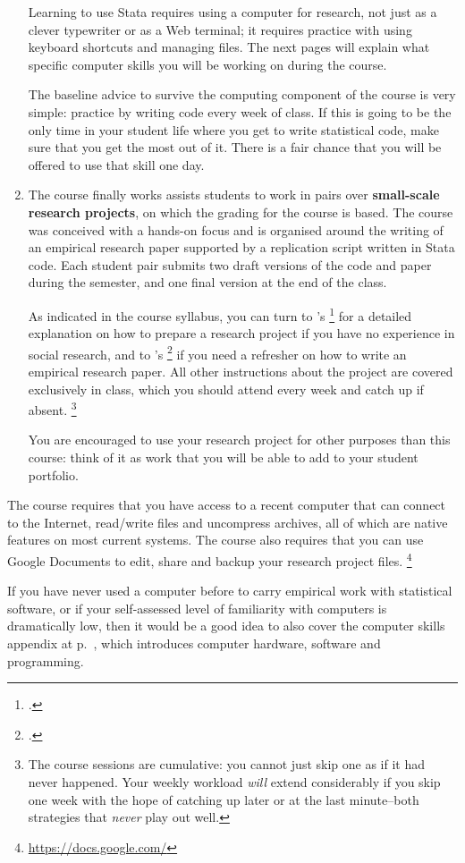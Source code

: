 \begin{enumerate}
		Learning to use Stata requires using a computer for research, not just as a clever typewriter or as a Web terminal; it requires practice with using keyboard shortcuts and managing files. The next pages will explain what specific computer skills you will be working on during the course.%
		
		The baseline advice to survive the computing component of the course is very simple: practice by writing code every week of class. If this is going to be the only time in your student life where you get to write statistical code, make sure that you get the most out of it. There is a fair chance that you will be offered to use that skill one day.%


  \item The course finally works assists students to work in pairs over \textbf{small-scale research projects}, on which the grading for the course is based. %
		The course was conceived with a hands-on focus and is organised around the  writing of an empirical research paper supported by a replication script written in Stata code. Each student pair submits two draft versions of the code and paper during the semester, and one final version at the end of the class.%
		
		As indicated in the course syllabus, you can turn to \citeauthor{BoothWilliams:2003v}'s \footcite{BoothWilliams:2003v} for a detailed explanation on how to prepare a research project if you have no experience in social research, and to \citeauthor{White:2005a}'s \footcite{White:2005a} if you need a refresher on how to write an empirical research paper. All other instructions about the project are covered exclusively in class, which you should attend every week and catch up if absent.%
		\footnote{The course sessions are cumulative: you cannot just skip one as if it had never happened. Your weekly workload \emph{will} extend considerably if you skip one week with the hope of catching up later or at the last minute–both strategies that \emph{never} play out well.}%
		
		You are encouraged to use your research project for other purposes than this course: think of it as work that you will be able to add to your student portfolio.%

\end{enumerate}

	The course requires that you have access to a recent computer that can connect to the Internet, read/write \PDF files and uncompress \ZIP archives, all of which are native features on most current systems. The course also requires that you can use Google Documents to edit, share and backup your research project files.%
	\footnote{\url{https://docs.google.com/}}%

  If you have never used a computer before to carry empirical work with statistical software, or if your self-assessed level of familiarity with computers is dramatically low, then it would be a good idea to also cover the computer skills appendix at p.~\pageref{ch:computers}, which introduces computer hardware, software and programming.%
